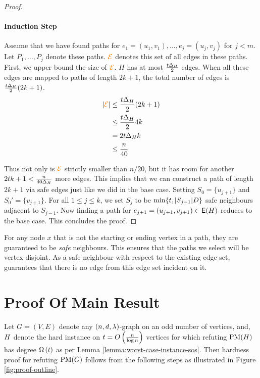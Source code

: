 \documentclass[11pt]{article}
\begin{document}
\begin{proof}
\paragraph{Induction Step}
	
Assume that we have found paths for $e_1 = (u_1, v_1), \dots, e_j=(u_j, v_j)$ for $j < m$.
Let $P_1, \dots, P_j$ denote these paths.
$\textcolor{orange}{\mathcal{E}}$ denotes this set of all edges in these paths.
First, we upper bound the size of $\textcolor{orange}{\mathcal{E}}$.
$H$ has at most $\frac{t\Delta_{H}}{2}$ edges.
When all these edges are mapped to paths of length $2k+1$, the total number of edges is $\frac{t\Delta_{H}}{2}(2k+1)$.
\begin{align*}
  |\textcolor{orange}{\mathcal{E}}|  &\leq \frac{t\Delta_{H}}{2}(2k+1) \\
                         &\le \frac{t\Delta_{H}}{2}4k \\
                         &= 2t\Delta_{H}k \\
                         &\leq \frac{n}{40}
\end{align*}

Thus not only is $\textcolor{orange}{\mathcal{E}}$ strictly smaller than $n/20$, but it has room for another $2tk+1 < \frac{n}{40\Delta_{H}}$ more edges.
This implies that we can construct a path of length $2k+1$ via safe edges just like we did in the base case.
Setting $S_0 = \{ u_{j+1}\}$ and $S_0' = \{v_{j+1} \}$.
For all $1 \le j \le k$, we set $S_{j}$ to be $\min\{t, |S_{j-1}|D \}$ safe neighbours adjacent to $S_{j-1}$.
Now finding a path for $e_{j+1} = (u_{j+1},v_{j+1}) \in \mathsf{E}(H)$ reduces to the base case.
This concludes the proof.

\end{proof}

\begin{remark}For any node $x$ that is not the starting or ending vertex in a path, they are guaranteed to be \emph{safe} neighbours.
  This ensures that the paths we select will be vertex-disjoint.
  As a safe neighbour with respect to the existing edge set, guarantees that there is no edge from this edge set incident on it.
\end{remark}


\section{Proof Of Main Result}
\label{sec:main-proof}

Let $G=(V,E)$ denote any $(n, d, \lambda)$-graph on an odd number of vertices, and,  $H$ denote the hard instance on $t=O\left(\frac{n}{\log n}\right)$ vertices for which refuting $\text{PM}(H)$ has degree $\Omega\left(t\right)$ as per Lemma \ref{lemma:worst-case-instance-sos}.
Then hardness proof for refuting $\text{PM}(G)$ follows from the following steps as illustrated in Figure \ref{fig:proof-outline}.
\end{document}
